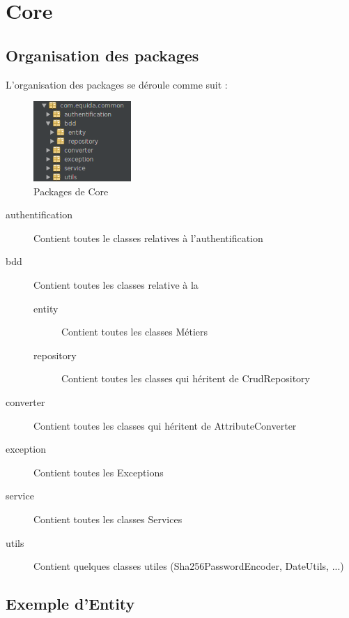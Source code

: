 \chapter{Core}
	\section{Organisation des packages}

		L'organisation des packages se déroule comme suit :

		\begin{figure}[H]
			\centering\includegraphics[width=0.33\textwidth, keepaspectratio]{res/package.png}
			\caption{Packages de Core}
		\end{figure}

		\begin{description}
			\item[authentification]{Contient toutes le classes relatives à l'authentification}
			\item[bdd]{Contient toutes les classes relative à la \bdd{}}

			\begin{description}
				\item[entity]{Contient toutes les classes Métiers}
				\item[repository]{Contient toutes les classes qui héritent de CrudRepository}
			\end{description}

			\item[converter]{Contient toutes les classes qui héritent de AttributeConverter}
			\item[exception]{Contient toutes les Exceptions}
			\item[service]{Contient toutes les classes Services}
			\item[utils]{Contient quelques classes utiles (Sha256PasswordEncoder, DateUtils, ...)}
		\end{description}

	\section{Exemple d'Entity}

